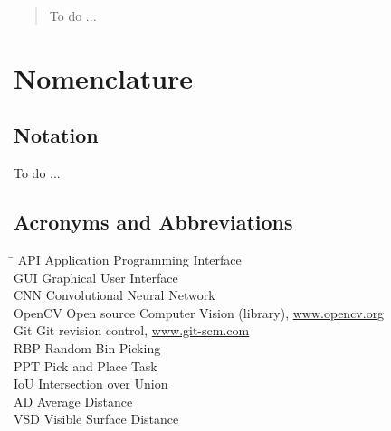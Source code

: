 \begin{abstract}
To do ... 
\end{abstract}

\chapter*{Nomenclature}\label{ch:symbols}

\section*{Notation}
\label{sec:notation}

To do ...

\section*{Acronyms and Abbreviations}
\label{sec:acronyms}

\begin{tabbing}
	\hspace*{3.5cm}		\= \kill
	API \> Application Programming Interface \\[1ex]
	GUI \> Graphical User Interface \\[1ex]
	CNN \> Convolutional Neural Network\\[1ex]
	OpenCV  \> Open source Computer Vision (library), \url{www.opencv.org} \\[1ex]
	Git  \> Git revision control, \url{www.git-scm.com} \\[1ex]
	RBP  \> Random Bin Picking \\[1ex]
	PPT  \> Pick and Place Task \\[1ex]
	IoU  \> Intersection over Union \\[1ex]
	AD  \> Average Distance \\[1ex]
	VSD  \> Visible Surface Distance \\[1ex]
\end{tabbing}